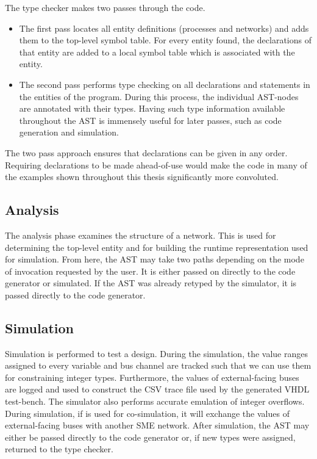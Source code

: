 The type checker makes two passes through the code.
\begin{itemize}
\item The first pass locates all entity definitions (processes and networks) and
  adds them to the top-level symbol table. For every entity found, the
  declarations of that entity are added to a local symbol table which is
  associated with the entity.
\item The second pass performs type checking on all declarations and statements
  in the entities of the program. During this process, the individual AST-nodes
  are annotated with their types.  Having
  such type information available throughout the AST is immensely useful for
  later passes, such as code generation and simulation.

\end{itemize}

The two pass approach ensures that declarations can be given in any
order. Requiring declarations to be made ahead-of-use would make the code in
many of the examples shown throughout this thesis significantly more convoluted.
  
\subsection{Analysis} The analysis phase examines the structure of a network.
This is used for determining the top-level entity and for building the runtime
representation used for simulation. From here, the AST may take two paths
depending on the mode of invocation requested by the user. It is either passed
on directly to the code generator or simulated. If the AST was already retyped
by the simulator, it is passed directly to the code generator.

\subsection{Simulation}
Simulation is performed to test a design. During the simulation, the value
ranges assigned to every variable and bus channel are tracked such that we can
use them for constraining integer types. Furthermore, the values of
external-facing buses are logged and used to construct the CSV trace file used
by the generated VHDL test-bench.  The simulator also performs accurate emulation of integer
overflows. During simulation, if \libsme{} is used for co-simulation, it will
exchange the values of external-facing buses with another SME network. After
simulation, the AST may either be passed directly to the code generator or, if
new types were assigned, returned to the type checker.


